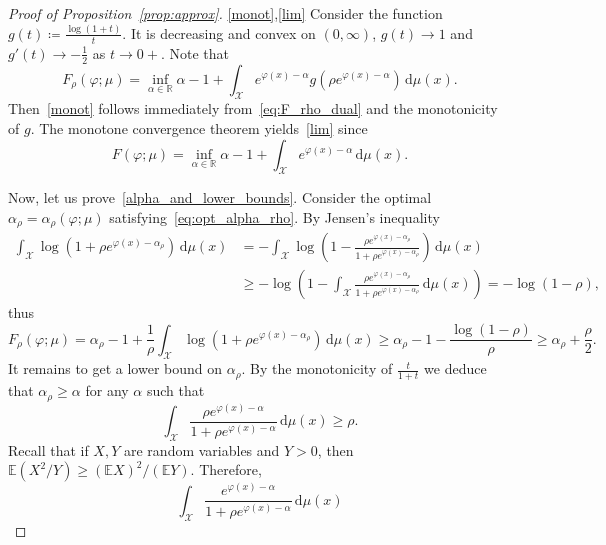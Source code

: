 \documentclass[10pt,a4paper]{amsart}
\newcommand{\E}{\mathbb{E}}
\newcommand{\R}{\mathbb{R}}
\def\cX{\mathcal{X}}
\newcommand{\dd}{\,\mathrm{d}}
\newcommand*{\eqset}{\coloneqq}
\begin{document}
\begin{proof}[Proof of Proposition~\ref{prop:approx}]
    \ref{monot},\ref{lim} Consider the function $g(t) \eqset \frac{\log(1 + t)}{t}$. 
    It is decreasing and convex on $(0, \infty)$, $g(t) \to 1$ and $g'(t) \to - \frac{1}{2}$ as $t \to 0+$.
    Note that
    \[
    F_\rho(\varphi ; \mu) = \inf_{\alpha \in \R} \alpha - 1 + \int_{\cX} e^{\varphi(x) - \alpha} g\left(\rho e^{\varphi(x) - \alpha}\right) \dd \mu(x) .
    \]
    Then~\ref{monot} follows immediately from~\eqref{eq:F_rho_dual} and the monotonicity of $g$. 
    The monotone convergence theorem yields~\ref{lim} since
    \[
    F(\varphi; \mu) = \inf_{\alpha \in \R} \alpha - 1 + \int_{ {\cX}} e^{\varphi(x) - \alpha} \dd \mu(x) .
    \]

    Now, let us prove~\ref{alpha_and_lower_bounds}. Consider the optimal $\alpha_{\rho} = \alpha_\rho(\varphi;\mu)$ satisfying~\eqref{eq:opt_alpha_rho}. 
    By Jensen's inequality
    \begin{align*}
        \int_{ {\cX}} \log\left(1 + \rho e^{\varphi(x) - \alpha_\rho}\right) \dd \mu(x) 
        &= - \int_{ {\cX}} \log\left(1 - \frac{\rho e^{\varphi(x) - \alpha_\rho}}{1 + \rho e^{\varphi(x) - \alpha_\rho}}\right) \dd \mu(x) \\
        &\ge - \log\left(1 - \int_{ {\cX}} \frac{\rho e^{\varphi(x) - \alpha_\rho}}{1 + \rho e^{\varphi(x) - \alpha_\rho}} \dd \mu(x)\right) = - \log(1 - \rho) ,
    \end{align*}
    thus
    \begin{equation}\label{eq:lower_1}
        F_\rho(\varphi; \mu) = \alpha_\rho - 1 + \frac{1}{\rho} \int_{ {\cX}} \log\left(1 + \rho e^{\varphi(x) - \alpha_\rho}\right) \dd \mu(x) 
        \ge \alpha_\rho - 1 - \frac{\log(1 - \rho)}{\rho} 
        \ge \alpha_\rho + \frac{\rho}{2} .
    \end{equation}
    It remains to get a lower bound on $\alpha_\rho$. 
    By the monotonicity of $\frac{t}{1+t}$ we deduce that $\alpha_\rho \ge \alpha$ for any $\alpha$ such that
    \begin{equation}\label{eq:smaller_alpha}
        \int_{ {\cX}} \frac{\rho e^{\varphi(x) - \alpha}}{1 + \rho e^{\varphi(x) - \alpha}} \dd \mu(x) \ge \rho .
    \end{equation}
    Recall that if $X,Y$ are random variables and $Y>0$, then $\E(X^2/Y) \geq (\E X)^2 / (\E Y)$. Therefore,
    \begin{equation*}
        \int_{ {\cX}} \frac{e^{\varphi(x) - \alpha}}{1 + \rho e^{\varphi(x) - \alpha}} \dd \mu(x) 

\end{equation*}
\end{proof}
\end{document}
